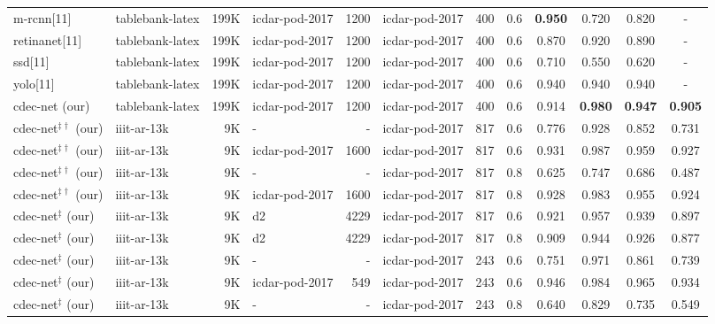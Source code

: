 \documentclass[a4paper,conference]{IEEEtran}
\begin{document}
\begin{table*}[ht!]
\begin{center}
\begin{tabular}{|l| l | r|l |r|l|r| c| c c c c|}
{\sc m-rcnn}[11] &{\sc t}able{\sc b}ank-{\sc l}a{\sc t}e{\sc x} &199K &{\sc icdar-pod}-2017 &1200 &{\sc icdar-pod}-2017 &400 &0.6 &\textbf{0.950} &0.720 &0.820 &- \\ 
{\sc r}etina{\sc n}et[11]&{\sc t}able{\sc b}ank-{\sc l}a{\sc t}e{\sc x} &199K &{\sc icdar-pod}-2017 &1200 &{\sc icdar-pod}-2017 &400 &0.6 &0.870 &0.920 &0.890 &- \\ 
{\sc ssd}[11]&{\sc t}able{\sc b}ank-{\sc l}a{\sc t}e{\sc x} &199K &{\sc icdar-pod}-2017 &1200 &{\sc icdar-pod}-2017 &400 &0.6 &0.710 &0.550 &0.620 &- \\ 
{\sc yolo}[11] &{\sc t}able{\sc b}ank-{\sc l}a{\sc t}e{\sc x} &199K &{\sc icdar-pod}-2017 &1200 &{\sc icdar-pod}-2017 &400 &0.6 &0.940 &0.940 &0.940 &- \\ 
{\sc cd}e{\sc c-n}et (our) &{\sc t}able{\sc b}ank-{\sc l}a{\sc t}e{\sc x} &199K &{\sc icdar-pod}-2017 &1200 &{\sc icdar-pod}-2017 &400 &0.6 &0.914 &\textbf{0.980} &\textbf{0.947} &\textbf{0.905} \\ \hhline{|=|=|=|=|=|=|=|=|====|} 
{\sc cd}e{\sc c-n}et$^{\ddagger\dagger}$ (our) &{\sc iiit-ar-13k} &9K &-  &-  &{\sc icdar-pod}-2017 &817 &0.6 &0.776 &0.928 &0.852 &0.731 \\ 
{\sc cd}e{\sc c-n}et$^{\ddagger\dagger}$ (our) &{\sc iiit-ar-13k} &9K &{\sc icdar-pod}-2017 &1600 &{\sc icdar-pod}-2017 &817 &0.6 &0.931 &0.987 &0.959 &0.927 \\
{\sc cd}e{\sc c-n}et$^{\ddagger\dagger}$ (our) &{\sc iiit-ar-13k} &9K &-  &-  &{\sc icdar-pod}-2017 &817 &0.8 &0.625 &0.747 &0.686 &0.487 \\ 
{\sc cd}e{\sc c-n}et$^{\ddagger\dagger}$ (our) &{\sc iiit-ar-13k} &9K &{\sc icdar-pod}-2017 &1600 &{\sc icdar-pod}-2017 &817 &0.8 &0.928 &0.983 &0.955 &0.924 \\
{\sc cd}e{\sc c-n}et$^{\ddagger}$ (our) &{\sc iiit-ar-13k} &9K &{\sc d}2 &4229 &{\sc icdar-pod}-2017 &817 &0.6 &0.921 &0.957 &0.939 &0.897 \\ 
{\sc cd}e{\sc c-n}et$^{\ddagger}$ (our) &{\sc iiit-ar-13k} &9K &{\sc d}2 &4229 &{\sc icdar-pod}-2017 &817 &0.8 &0.909 &0.944 &0.926 &0.877 \\
{\sc cd}e{\sc c-n}et$^{\ddagger}$ (our) &{\sc iiit-ar-13k} &9K &- & -&{\sc icdar-pod}-2017 &243 &0.6 &0.751 &0.971 &0.861 &0.739 \\
{\sc cd}e{\sc c-n}et$^{\ddagger}$ (our) &{\sc iiit-ar-13k} &9K &{\sc icdar-pod}-2017 &549 &{\sc icdar-pod}-2017 &243 &0.6 &0.946 &0.984 &0.965 &0.934 \\
{\sc cd}e{\sc c-n}et$^{\ddagger}$ (our) &{\sc iiit-ar-13k} &9K &- & -&{\sc icdar-pod}-2017 &243 &0.8 &0.640 &0.829 &0.735 &0.549 \\

\end{tabular}
\end{center}
\end{table*}
\end{document}
